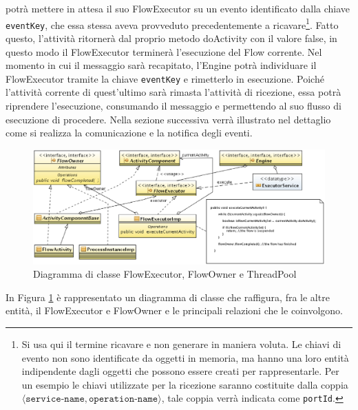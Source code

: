 
potrà mettere in attesa il suo FlowExecutor su un evento identificato dalla
chiave \texttt{eventKey}, che essa stessa aveva provveduto precedentemente a
ricavare\footnote{Si usa qui il termine ricavare e non generare in maniera
voluta. Le chiavi di evento non sono identificate da oggetti in memoria, ma
hanno una loro entità indipendente
  dagli oggetti che possono essere creati per rappresentarle. Per un esempio le
  chiavi utilizzate per la ricezione saranno costituite dalla coppia
  $\langle \texttt{service-name}, \texttt{operation-name} \rangle$, tale coppia
  verrà indicata come \texttt{portId}.}. Fatto questo, l'attività ritornerà dal proprio
metodo doActivity con il valore false, in questo modo il FlowExecutor terminerà
l'esecuzione del Flow corrente. Nel momento in cui il messaggio sarà recapitato,
l'Engine potrà individuare il FlowExecutor tramite la chiave \texttt{eventKey} e
rimetterlo in esecuzione. Poiché l'attività corrente di quest'ultimo sarà rimasta
l'attività di ricezione, essa potrà riprendere l'esecuzione, consumando il
messaggio e permettendo al suo flusso di esecuzione di procedere. Nella sezione
successiva verrà illustrato nel dettaglio come si realizza la comunicazione e la
notifica degli eventi.

\begin{figure}[!t]
\begin{center}
\includegraphics[angle=90,scale=0.626,clip]
{architettura_interna/dia/flowClassDiagram}
\caption[Diagramma di classe FlowExecutor \ldots] {
   	Diagramma di classe FlowExecutor, FlowOwner e ThreadPool}
  \label{fig:flowclass}
\end{center}
\end{figure}

In Figura \ref{fig:flowclass} \`e rappresentato un diagramma di classe che
raffigura, fra le altre entità, il FlowExecutor e FlowOwner e le principali
relazioni che le coinvolgono.

